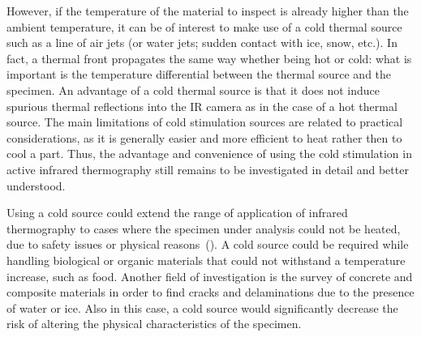 However, if the temperature of the material to inspect is already higher than the ambient temperature, it can be of interest to make use of a cold thermal source such as a line of air jets (or water jets; sudden contact with ice, snow, etc.). In fact, a thermal front propagates the same way whether being hot or cold: what is important is the temperature differential between the thermal source and the specimen. An advantage of a cold thermal source is that it does not induce spurious thermal reflections into the IR camera as in the case of a hot thermal source. The main limitations of cold stimulation sources are related to practical considerations, as it is generally easier and more efficient to heat rather then to cool a part.
Thus, the advantage and convenience of using the cold stimulation in active infrared thermography  still remains to be investigated in detail and better understood. 

Using a cold source could extend the range of application of infrared thermography to cases where the specimen under analysis could not be heated, due to safety issues or physical reasons~(\citet{Livingston2018High}). A cold source could be required while handling biological or organic materials   that could not withstand a temperature increase, such as food. Another field of investigation is the survey of concrete and composite materials in order to find cracks and delaminations due to the presence of water or ice. Also in this case, a cold source would significantly decrease the risk of altering the physical characteristics of the specimen. 

